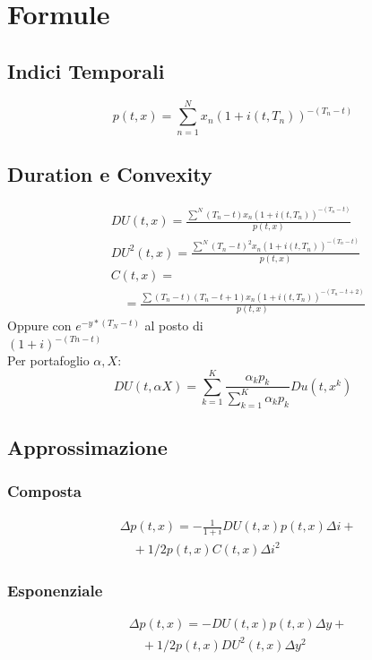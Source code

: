 \documentclass[a4paper,notitlepage]{report}%
\begin{document}
\section*{Formule}

\begin{multicols*}{2}


\section*{Indici Temporali}

    \[
        p(t,x)=\sum_{n=1}^N x_n(1+i(t,T_n))^{-(T_n-t)}    
    \]

    \subsection*{Duration e Convexity}
    \begin{align*}
        & DU(t,x) = \frac{ \sum^N (T_n-t) x_n (1+i(t,T_n))^{-(T_n-t)} }{p(t,x)} \\
        & DU^2(t,x) = \frac{ \sum^N (T_n-t)^2 x_n (1+i(t,T_n))^{-(T_n-t)} }{p(t,x)} \\
        & C(t,x) = \\
        & \quad  = \frac{ \sum (T_n-t) (T_n-t+1) x_n (1+i(t,T_n))^{-(T_n-t+2)} }{p(t,x)}
    \end{align*}
    Oppure con $e^{-y*(T_N-t)}$ al posto di \\ 
    $(1+i)^{-(Tn-t)}$\\
    Per portafoglio $\alpha,X$:
    \[
        DU(t,\alpha X) = \sum_{k=1}^K \frac{\alpha_k p_k}{\sum_{k=1}^K \alpha_k p_k} Du(t,x^k)
    \]

    \subsection*{Approssimazione}

        \subsubsection*{Composta}
        \begin{align*}
            & \Delta p(t,x) = -\frac{1}{1+i} DU(t,x) p(t,x) \Delta i + \\
            & \quad + 1/2 p(t,x) C(t,x) \Delta i^2
        \end{align*}

        \subsubsection*{Esponenziale}
        \begin{align*}
            & \Delta p(t,x) = -DU(t,x) p(t,x) \Delta y + \\
            & \quad + 1/2 p(t,x) DU^2(t,x) \Delta y^2
        \end{align*}

\end{multicols*}
\end{document}
